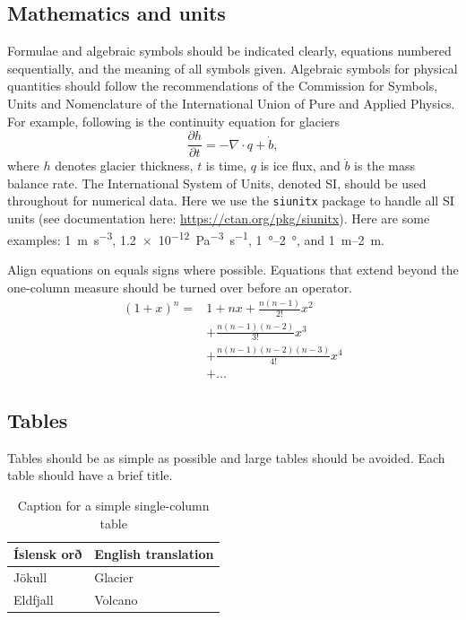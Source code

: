 \documentclass{jokull}
\begin{document}
\subsection{Mathematics and units}

Formulae and algebraic symbols should be indicated clearly, equations numbered sequentially, and the meaning of all symbols given. Algebraic symbols for physical quantities should follow the recommendations of the Commission for Symbols, Units and Nomenclature of the International Union of Pure and Applied Physics. For example, following is the continuity equation for glaciers
\begin{equation}\label{eq:ContinuityEquation}
    \frac{\partial h}{\partial t} = - \nabla \cdot q + \dot{b},
\end{equation}
where $h$ denotes glacier thickness, $t$ is time, $q$ is ice flux, and $\dot{b}$ is the mass balance rate. The International System of Units, denoted SI, should be used throughout for numerical data. Here we use the \verb"siunitx" package to handle all SI units (see documentation here: \url{https://ctan.org/pkg/siunitx}). Here are some examples: \qty{1}{\metre\per\second\cubed}, \qty{1.2e-12}{\pascal^{-3}\second^{-1}}, \qtyrange{1}{2}{\degree}, and \qtyrange[range-phrase=--,range-units=single]{1}{2}{\metre}.

Align equations on equals signs where possible. Equations that extend beyond the one-column measure should be turned over before an operator.
\begin{equation}
\begin{split}
    \left(1+x\right)^n = & 1 + nx + \frac{n\left(n-1\right)}{2!}x^2 \\
    & + \frac{n\left(n-1\right)\left(n-2\right)}{3!}x^3 \\
    & + \frac{n\left(n-1\right)\left(n-2\right)\left(n-3\right)}{4!}x^4 \\
    & + \ldots
\end{split}
\end{equation}

\subsection{Tables}

Tables should be as simple as possible and large tables should be avoided. Each table should have a brief title.
\begin{table}[h]
    \centering
    \caption{Caption for a simple single-column table}
    \label{tab:table01}
    \begin{tabular}{ll}
        \hline
        Íslensk orð & English translation \\ \hline
        Jökull & Glacier \\
        Eldfjall & Volcano \\ \hline
    \end{tabular}
\end{table}
\end{document}
